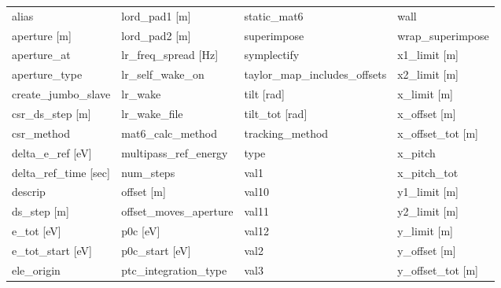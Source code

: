  \begin{tabular}{llll} \toprule
alias                            & lord_pad1 [m]                    & static_mat6                      & wall                             \\
aperture [m]                     & lord_pad2 [m]                    & superimpose                      & wrap_superimpose                 \\
aperture_at                      & lr_freq_spread [Hz]              & symplectify                      & x1_limit [m]                     \\
aperture_type                    & lr_self_wake_on                  & taylor_map_includes_offsets      & x2_limit [m]                     \\
create_jumbo_slave               & lr_wake                          & tilt [rad]                       & x_limit [m]                      \\
csr_ds_step [m]                  & lr_wake_file                     & tilt_tot [rad]                   & x_offset [m]                     \\
csr_method                       & mat6_calc_method                 & tracking_method                  & x_offset_tot [m]                 \\
delta_e_ref [eV]                 & multipass_ref_energy             & type                             & x_pitch                          \\
delta_ref_time [sec]             & num_steps                        & val1                             & x_pitch_tot                      \\
descrip                          & offset [m]                       & val10                            & y1_limit [m]                     \\
ds_step [m]                      & offset_moves_aperture            & val11                            & y2_limit [m]                     \\
e_tot [eV]                       & p0c [eV]                         & val12                            & y_limit [m]                      \\
e_tot_start [eV]                 & p0c_start [eV]                   & val2                             & y_offset [m]                     \\
ele_origin                       & ptc_integration_type             & val3                             & y_offset_tot [m]                 \\

\end{tabular}
